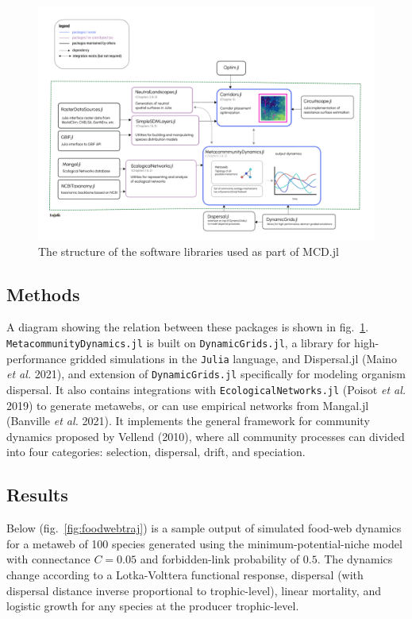 \documentclass[10pt,oneside]{article}
\makeatletter
\def\maxwidth{\ifdim\Gin@nat@width>\linewidth\linewidth
\else\Gin@nat@width\fi}
\let\Oldincludegraphics\includegraphics
\renewcommand{\includegraphics}[1]{\Oldincludegraphics[width=\maxwidth]{#1}}
\makeatother
\begin{document}
\begin{figure}
\hypertarget{fig:software}{%
\centering
\includegraphics{./figures/ch4.png}
\caption{The structure of the software libraries used as part of
MCD.jl}\label{fig:software}
}
\end{figure}

\hypertarget{methods-3}{%
\subsection{Methods}\label{methods-3}}

A diagram showing the relation between these packages is shown in
fig.~\ref{fig:software}. \texttt{MetacommunityDynamics.jl} is built on
\texttt{DynamicGrids.jl}, a library for high-performance gridded
simulations in the \texttt{Julia} language, and Dispersal.jl (Maino
\emph{et al.} 2021), and extension of \texttt{DynamicGrids.jl}
specifically for modeling organism dispersal. It also contains
integrations with \texttt{EcologicalNetworks.jl} (Poisot \emph{et al.}
2019) to generate metawebs, or can use empirical networks from Mangal.jl
(Banville \emph{et al.} 2021). It implements the general framework for
community dynamics proposed by Vellend (2010), where all community
processes can divided into four categories: selection, dispersal, drift,
and speciation.

\hypertarget{results-2}{%
\subsection{Results}\label{results-2}}

Below (fig.~\ref{fig:foodwebtraj}) is a sample output of simulated
food-web dynamics for a metaweb of 100 species generated using the
minimum-potential-niche model with connectance \(C=0.05\) and
forbidden-link probability of \(0.5\). The dynamics change according to
a Lotka-Volttera functional response, dispersal (with dispersal distance
inverse proportional to trophic-level), linear mortality, and logistic
growth for any species at the producer trophic-level.
\end{document}
